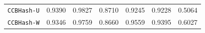 \begin{table}[tp]
{\begin{tabular}{lcccccc}
\texttt{CCBHash-U} & {\cellcolor[HTML]{FBFBF2}} \color[HTML]{000000} 0.9390 & {\cellcolor[HTML]{FFFFFF}} \color[HTML]{000000} 0.9827 & {\cellcolor[HTML]{F3F3DB}} \color[HTML]{000000} 0.8710 & {\cellcolor[HTML]{F9F9ED}} \color[HTML]{000000} 0.9245 & {\cellcolor[HTML]{F9F9ED}} \color[HTML]{000000} 0.9228 & {\cellcolor[HTML]{7B4E4E}} \color[HTML]{F1F1F1} 0.5064 \\
\texttt{CCBHash-W} & {\cellcolor[HTML]{FAFAF0}} \color[HTML]{000000} 0.9346 & {\cellcolor[HTML]{FEFEFD}} \color[HTML]{000000} 0.9759 & {\cellcolor[HTML]{F3F3D8}} \color[HTML]{000000} 0.8660 & {\cellcolor[HTML]{FCFCF7}} \color[HTML]{000000} 0.9559 & {\cellcolor[HTML]{FBFBF2}} \color[HTML]{000000} 0.9395 & {\cellcolor[HTML]{D4B699}} \color[HTML]{000000} 0.6027 \\
\bottomrule
\end{tabular}
}%
\end{table}

